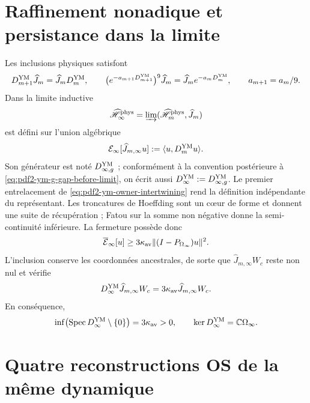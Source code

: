 \section{Raffinement nonadique et persistance dans la limite}

Les inclusions physiques satisfont
\begin{equation}\label{eq:pdf2-ym-owner-intertwining}
 D_{m+1}^{\rm YM}\widehat J_m
 =\widehat J_mD_m^{\rm YM},\qquad
 \bigl(e^{-a_{m+1}D_{m+1}^{\rm YM}}\bigr)^9\widehat J_m
 =\widehat J_me^{-a_mD_m^{\rm YM}},\qquad a_{m+1}=a_m/9.
\end{equation}
Dans la limite inductive
\begin{equation}\label{eq:pdf2-ym-owner-inductive-limit}
 \widehat{\mathscr H}_\infty^{\rm phys}
 =\varinjlim(\widehat{\mathscr H}_m^{\rm phys},\widehat J_m)
\end{equation}
est défini sur l’union algébrique
\begin{equation}\label{eq:pdf2-ym-owner-limit-form}
 \mathcal E_\infty[\widehat J_{m,\infty}u]
 :=\langle u,D_m^{\rm YM}u\rangle.
\end{equation}
Son générateur est noté
$D_{\infty,g}^{\rm YM}$ ; conformément à la convention postérieure à
\eqref{eq:pdf2-ym-g-gap-before-limit}, on écrit aussi
$D_\infty^{\rm YM}:=D_{\infty,g}^{\rm YM}$.
Le premier entrelacement de \eqref{eq:pdf2-ym-owner-intertwining} rend la
définition indépendante du représentant. Les troncatures de Hoeffding sont
un cœur de forme et donnent une suite de récupération ; Fatou sur la somme non négative
donne la semi-continuité inférieure. La fermeture possède donc
\begin{equation}\label{eq:pdf2-ym-owner-limit-gap}
 \overline{\mathcal E}_\infty[u]
 \ge3\kappa_{\rm av}\|(I-P_{\Omega_\infty})u\|^2.
\end{equation}
L’inclusion conserve les coordonnées ancestrales, de sorte que
$\widehat J_{m,\infty}W_c$ reste non nul et vérifie
\begin{equation}\label{eq:pdf2-ym-owner-limit-witness}
 D_\infty^{\rm YM}\widehat J_{m,\infty}W_c
 =3\kappa_{\rm av}\widehat J_{m,\infty}W_c.
\end{equation}
En conséquence,
\begin{equation}\label{eq:pdf2-ym-owner-exact-gap}
 \inf\bigl(\operatorname{Spec}D_\infty^{\rm YM}\setminus\{0\}\bigr)
 =3\kappa_{\rm av}>0,
 \qquad \ker D_\infty^{\rm YM}=\mathbb C\Omega_\infty.
\end{equation}

\section{Quatre reconstructions OS de la même dynamique}

